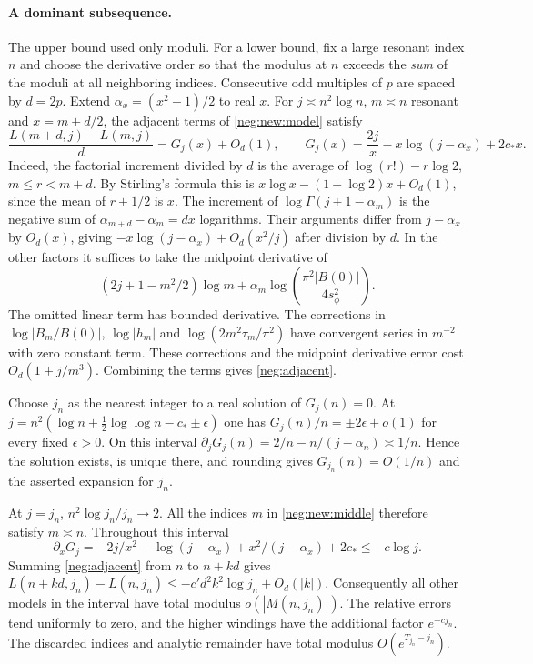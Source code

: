 \documentclass[11pt]{article}
\numberwithin{equation}{section}
\theoremstyle{definition}
\begin{document}
\paragraph{A dominant subsequence.}
The upper bound used only moduli. For a lower bound, fix a large
resonant index $n$ and choose the derivative order so that the modulus
at $n$ exceeds the \emph{sum} of the moduli at all neighboring indices.
Consecutive odd multiples of $p$ are spaced by $d=2p$.
Extend $\alpha_x=(x^2-1)/2$ to real $x$. For $j\asymp n^2\log n$,
$m\asymp n$ resonant and $x=m+d/2$, the adjacent terms of
\eqref{neg:new:model} satisfy
\begin{equation}\label{neg:adjacent}
 \frac{L(m+d,j)-L(m,j)}{d}=G_j(x)+O_d(1),\qquad
 G_j(x)=\frac{2j}{x}-x\log(j-\alpha_x)+2c_*x .
\end{equation}
Indeed, the factorial increment divided by $d$ is the average of
$\log(r!)-r\log2$, $m\le r<m+d$. By Stirling's formula this is
$x\log x-(1+\log2)x+O_d(1)$, since the mean of $r+1/2$ is $x$.
The increment of $\log\Gamma(j+1-\alpha_m)$ is the negative sum
of $\alpha_{m+d}-\alpha_m=dx$ logarithms. Their arguments differ
from $j-\alpha_x$ by $O_d(x)$, giving
$-x\log(j-\alpha_x)+O_d(x^2/j)$ after division by $d$.
In the other factors it suffices to take the midpoint derivative of
\[
 (2j+1-m^2/2)\log m+
 \alpha_m\log\!\left(\frac{\pi^2|B(0)|}{4s_\phi^2}\right).
\]
The omitted linear term has bounded derivative. The corrections in
$\log|B_m/B(0)|$, $\log|h_m|$ and $\log(2m^2\tau_m/\pi^2)$
have convergent series in $m^{-2}$ with zero constant term.
These corrections and the midpoint derivative error cost
$O_d(1+j/m^3)$. Combining the terms gives \eqref{neg:adjacent}.

Choose $j_n$ as the nearest integer to a real solution of $G_j(n)=0$.
At $j=n^2(\log n+\tfrac12\log\log n-c_*\pm\epsilon)$ one has
$G_j(n)/n=\pm2\epsilon+o(1)$ for every fixed $\epsilon>0$.
On this interval $\partial_jG_j(n)=2/n-n/(j-\alpha_n)\asymp1/n$.
Hence the solution exists, is unique there, and rounding gives
$G_{j_n}(n)=O(1/n)$ and the asserted expansion for $j_n$.

At $j=j_n$, $n^2\log j_n/j_n\to2$. All the indices $m$ in
\eqref{neg:new:middle} therefore satisfy $m\asymp n$. Throughout
this interval
\[
 \partial_xG_j=-2j/x^2-\log(j-\alpha_x)+x^2/(j-\alpha_x)+2c_*
 \le-c\log j .
\]
Summing \eqref{neg:adjacent} from $n$ to $n+kd$ gives
$L(n+kd,j_n)-L(n,j_n)\le-c'd^2 k^2\log j_n+O_d(|k|)$.
Consequently all other models in the interval have total modulus
$o(|M(n,j_n)|)$. The relative errors tend uniformly to zero, and the
higher windings have the additional factor $e^{-cj_n}$. The discarded
indices and analytic remainder have total modulus $O(e^{T_{j_n}-j_n})$.
\end{document}
